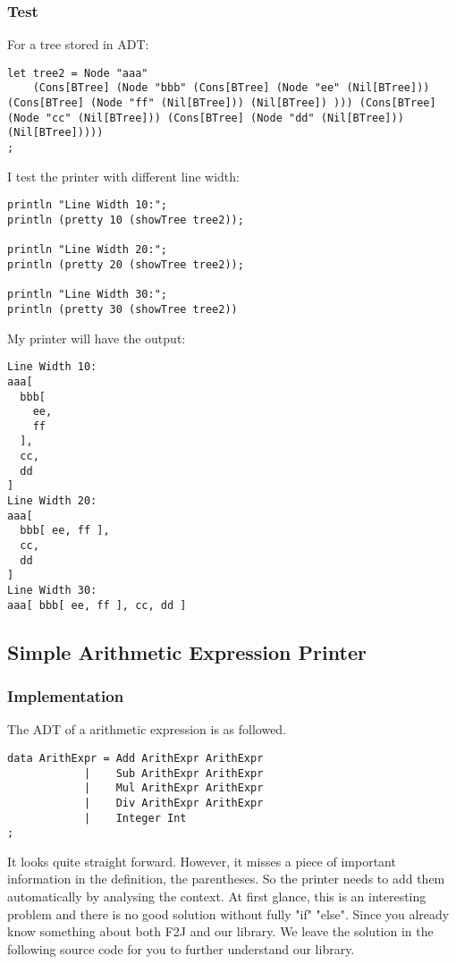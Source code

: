 \subsubsection{Test}

For a tree stored in ADT:
\begin{lstlisting}
let tree2 = Node "aaa"
    (Cons[BTree] (Node "bbb" (Cons[BTree] (Node "ee" (Nil[BTree])) (Cons[BTree] (Node "ff" (Nil[BTree])) (Nil[BTree]) ))) (Cons[BTree] (Node "cc" (Nil[BTree])) (Cons[BTree] (Node "dd" (Nil[BTree])) (Nil[BTree]))))
;
\end{lstlisting}

I test the printer with different line width:
\begin{lstlisting}
println "Line Width 10:";
println (pretty 10 (showTree tree2));

println "Line Width 20:";
println (pretty 20 (showTree tree2));

println "Line Width 30:";
println (pretty 30 (showTree tree2))
\end{lstlisting}

My printer will have the output:
\begin{lstlisting}
Line Width 10:
aaa[
  bbb[
    ee,
    ff
  ],
  cc,
  dd
]
Line Width 20:
aaa[
  bbb[ ee, ff ],
  cc,
  dd
]
Line Width 30:
aaa[ bbb[ ee, ff ], cc, dd ]
\end{lstlisting}

\subsection{Simple Arithmetic Expression Printer}

\subsubsection{Implementation}
The ADT of a arithmetic expression is as followed.
\begin{lstlisting}
data ArithExpr = Add ArithExpr ArithExpr
            |    Sub ArithExpr ArithExpr
            |    Mul ArithExpr ArithExpr
            |    Div ArithExpr ArithExpr
            |    Integer Int
;
\end{lstlisting}

It looks quite straight forward. However, it misses a piece of important information in the definition, the parentheses. So the printer needs to add them automatically by analysing the context. At first glance, this is an interesting problem and there is no good solution without fully "if" "else". Since you already know something about both F2J and our library. We leave the solution in the following source code for you to further understand our library.

